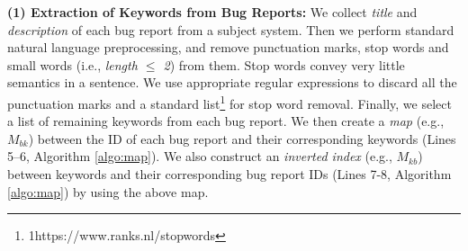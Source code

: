 \documentclass[sigconf,review,anonymous]{acmart}
\begin{document}
\textbf{(1) Extraction of Keywords from Bug Reports:} We collect \emph{title} and \emph{description} of each bug report from a subject system.  
Then we perform standard natural language preprocessing, and remove punctuation marks, stop words and small words (i.e., \emph{length $\le$ 2}) from them. Stop words convey very little semantics in a sentence. 
We use appropriate regular expressions to discard all the punctuation marks and 
a standard list\footnote{{1}https://www.ranks.nl/stopwords} for stop word removal. 
Finally, we select a list of remaining keywords from each bug report. 
We then create a \emph{map} (e.g., $M_{bk}$) between the ID of each bug report and their corresponding keywords (Lines 5--6, Algorithm \ref{algo:map}).   
We also construct an \emph{inverted index} (e.g., $M_{kb}$) between keywords and their corresponding bug report IDs (Lines 7-8, Algorithm \ref{algo:map}) by using the above map.
\end{document}
